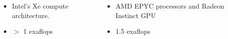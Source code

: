 \begin{frame}
\begin{columns}[T]
\begin{column}{0.49\textwidth}
\begin{center}
      \end{center}
    \end{column}
  \end{columns}
  \begin{columns}[T]
    \begin{column}{0.49\textwidth}
    \begin{itemize}
      \item Intel’s Xe compute architecture.
      \item $>$ 1 exaflops
    \end{itemize}
    \end{column}
    \begin{column}{0.49\textwidth}
      \begin{itemize}
        \item AMD EPYC processors and Radeon Instinct GPU
        \item 1.5 exaflops
      \end{itemize}
    \end{column}
  \end{columns}
\end{frame}

